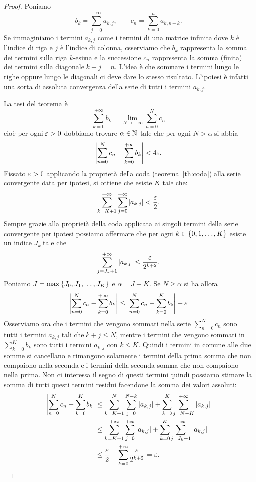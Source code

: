 \begin{proof}
Poniamo 
\[
  b_k = \sum_{j=0}^{+\infty} a_{k,j},\qquad
  c_n = \sum_{k=0}^{n} a_{k,n-k}.
\]
Se immaginiamo i termini $a_{k,j}$ come i termini di una matrice 
infinita dove $k$ è l'indice di riga e $j$ è l'indice di colonna,
osserviamo che $b_k$ rappresenta la somma dei termini sulla riga 
$k$-esima e la successione $c_n$ rappresenta la somma (finita)
dei termini sulla diagonale $k+j=n$. 
L'idea è che sommare i termini lungo le righe oppure lungo le diagonali 
ci deve dare lo stesso risultato. 
L'ipotesi è infatti una sorta di assoluta convergenza della serie di tutti 
i termini $a_{k,j}$.

La tesi del teorema è
\[
\sum_{k=0}^{+\infty} b_k = \lim_{N\to +\infty} \sum_{n=0}^N c_n  
\]
cioè per ogni $\varepsilon>0$ dobbiamo trovare $\alpha\in {\mathbb N}$ tale che per 
ogni $N > \alpha$ si abbia
\[
  {\left|\sum_{n=0}^N c_n - \sum_{k=0}^{+\infty} b_k\right|} < 4\varepsilon.  
\]
Fissato $\varepsilon>0$ applicando la proprietà della coda 
(teorema~\ref{th:coda}) alla serie convergente data per ipotesi,
si ottiene che esiste $K$ tale che:
\[
  \sum_{k=K+1}^{+\infty} \sum_{j=0}^{+\infty} {\left|a_{k,j}\right|} < \frac{\varepsilon} 2.
\]
Sempre grazie alla proprietà della coda applicata ai singoli termini 
della serie convergente per ipotesi possiamo affermare che per ogni 
$k\in {\left\{ 0,1,\dots, K \right\}}$ esiste un indice $J_k$ tale che 
\[
  \sum_{j=J_k+1}^{+\infty} {\left|a_{k,j}\right|} \le \frac{\varepsilon}{2^{k+2}}.
\]
Poniamo $J=\max{\left\{ J_0,J_1, \dots, J_K \right\}}$ e $\alpha = J + K$.
Se $N\ge \alpha$ si ha allora 
\begin{align*}
  {\left|\sum_{n=0}^N c_n - \sum_{k=0}^{+\infty} b_k\right|}
  &\le {\left|\sum_{n=0}^N c_n - \sum_{k=0}^{K} b_k\right|} + \varepsilon \\
\end{align*}
Osserviamo ora che i termini che vengono sommati nella serie 
$\sum_{n=0}^N c_n$ sono tutti i termini $a_{k,j}$ tali che $k+j\le N$,
mentre i termini che vengono sommati in $\sum_{k=0}^K b_k$ 
sono tutti i termini $a_{k,j}$ con $k\le K$. 
Quindi i termini in comune alle due somme si cancellano e rimangono solamente 
i termini della prima somma che non compaiono nella seconda e i termini 
della seconda somma che non compaiono nella prima. 
Non ci interessa il segno di questi termini quindi possiamo stimare la somma 
di tutti questi termini residui facendone la somma dei valori assoluti:
\begin{align*}
  {\left|\sum_{n=0}^N c_n - \sum_{k=0}^{K} b_k\right|}
  & \le \sum_{k=K+1}^N \sum_{j=0}^{N-k} {\left|a_{k,j}\right|}
   + \sum_{k=0}^{K}\sum_{j=N-K}^{+\infty} {\left|a_{k,j}\right|}\\ 
  & \le \sum_{k=K+1}^{+\infty}\sum_{j=0}^{+\infty} {\left|a_{k,j}\right|}
   + \sum_{k=0}^K \sum_{j=J_k+1}^{+\infty} {\left|a_{k,j}\right|} \\ 
  & \le \frac{\varepsilon} 2 + \sum_{k=0}^{+\infty} \frac{\varepsilon}{2^{k+2}}
   = \varepsilon.
\end{align*}
\end{proof}


